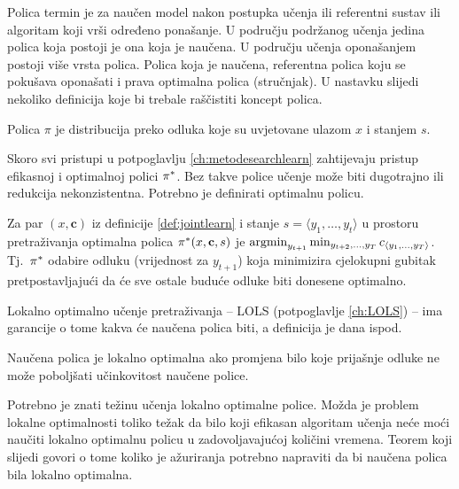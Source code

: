 Polica  termin je za naučen model nakon postupka učenja ili
referentni sustav ili algoritam koji vrši određeno ponašanje. U području
podržanog učenja jedina polica koja postoji je ona koja je naučena. U području
učenja oponašanjem  postoji više vrsta polica. Polica
koja je naučena, referentna polica koju se pokušava oponašati i prava optimalna
polica (stručnjak). U nastavku slijedi nekoliko definicija koje bi trebale
raščistiti koncept polica.

\begin{definition}[Polica]

  Polica $\pi$ je distribucija preko odluka koje su uvjetovane ulazom $x$ i
  stanjem $s$.

\end{definition}

\noindent
Skoro svi pristupi u potpoglavlju \ref{ch:metodesearchlearn} zahtijevaju pristup
efikasnoj i optimalnoj polici $\pi\ssymbol{1}$. Bez takve police učenje može
biti dugotrajno ili redukcija nekonzistentna. Potrebno je definirati optimalnu
policu.

\begin{definition}\label{def:optimalpolicy}

  Za par $(x, \mathbf{c})$ iz definicije \ref{def:jointlearn} i stanje $s =
  \langle y_1, \ldots, y_t \rangle$ u prostoru pretraživanja optimalna polica
  $\pi\ssymbol{1}(x, \mathbf{c}, s)$ je $\operatorname*{argmin}_{y_{t+1}} \min_{y_{t+2},
  \ldots, y_T} c_{\langle y_1, \ldots, y_T \rangle}$. Tj.~$\pi\ssymbol{1}$
  odabire odluku (vrijednost za $y_{t+1}$) koja minimizira cjelokupni gubitak
  pretpostavljajući da će sve ostale buduće odluke biti donesene optimalno.

\end{definition}

\noindent
Lokalno optimalno učenje pretraživanja -- \textsc{LOLS} (potpoglavlje
\ref{ch:LOLS}) --  ima garancije o tome kakva će naučena polica biti, a
definicija je dana ispod.

\begin{definition}

  Naučena polica je lokalno optimalna ako promjena bilo koje prijašnje odluke ne
  može poboljšati učinkovitost naučene police.

\end{definition}

\noindent
Potrebno je znati težinu učenja lokalno optimalne police. Možda je problem
lokalne optimalnosti toliko težak da bilo koji efikasan algoritam učenja neće
moći naučiti lokalno optimalnu policu u zadovoljavajućoj količini vremena.
Teorem koji slijedi govori o tome koliko je ažuriranja potrebno napraviti da bi
naučena polica bila lokalno optimalna.


